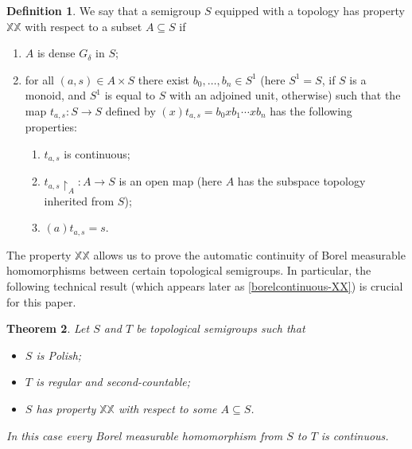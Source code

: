 \documentclass[11pt]{amsart}
\newtheorem{theorem}{Theorem}[section]
\theoremstyle{definition}
\newtheorem{definition}[theorem]{Definition}
\begin{document}
\begin{definition}\label{XX}
    We say that a semigroup \(S\) equipped with a topology has property $\mathbb{XX}$ with respect to a subset \(A\subseteq S\) if 
    \begin{enumerate}
        \item[(1)]  \(A\) is dense \(G_\delta\) in $S$;
        \item[(2)] for all \((a, s)\in A\times S\) there exist $b_0,\ldots,b_n\in S^1$ (here $S^1=S$, if $S$ is a monoid, and $S^1$ is equal to $S$ with an adjoined unit, otherwise) such that the map $t_{a,s}:S\rightarrow S$ defined by $(x)t_{a,s}=b_0xb_1\cdots xb_n$ has the following properties:
         \begin{enumerate}
    \item[(2.1)] $t_{a,s}$ is continuous;
    \item[(2.2)] $t_{a,s}{\restriction}_A: A\rightarrow S$ is an open map (here $A$ has the subspace topology inherited from $S$); 
    \item[(2.3)] \((a)t_{a, s}=s\).
    \end{enumerate}
    \end{enumerate}   
\end{definition}
The property $\mathbb{XX}$ allows us to prove the automatic continuity of Borel measurable homomorphisms between certain topological semigroups. In particular, the following technical result (which appears later as \cref{borelcontinuous-XX}) is crucial for this paper.

\begin{theorem}
    Let \(S\) and \(T\) be topological semigroups such that
    \begin{itemize}
        \item \(S\) is Polish;
        \item \(T\) is regular and second-countable;
        \item \(S\) has property $\mathbb{XX}$ with respect to some \(A\subseteq S\).
   \end{itemize}
    In this case every Borel measurable homomorphism from \(S\) to \(T\) is continuous. 
\end{theorem}
\end{document}
